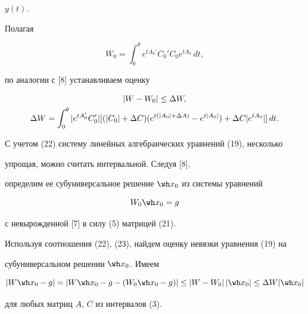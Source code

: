 $y(t)$.





Полагая


\begin{equation}


W_0 = \int_0^{\theta} e^{t A_0'} C_0' C_0 e^{ t A_0} \, d t,


\end{equation}


по аналогии с [8] устанавливаем оценку


\begin{gather}


|W-W_0| \le \Delta W, \notag \\


\Delta W = \int_{0}^{\theta}| e^{ t A_0' } C_0'|


[( |C_0|+\Delta C )(e^{ t ( |A_0|+\Delta A ) } -


e^{ t |A_0|})+\Delta C | e^{ t A_0 } |] \, dt.


\end{gather} 


С учетом (22) систему линейных алгебраических уравнений (19), несколько


упрощая, можно считать интервальной. Следуя [8],


определим ее субуниверсальное решение $\wh x_0$ из системы уравнений


\begin{equation}


W_0 \wh x_0 = g


\end{equation}


с невырожденной [7] в силу (5) матрицей (21).





Используя соотношения (22), (23), найдем оценку невязки уравнения (19) на


субуниверсальном решении $ \wh x_0$. Имеем


\begin{equation}


|W \wh x_0 - g| = | W \wh x_0 - g -( W_0 \wh x_0 - g)| \le


|W-W_0|\,|\wh x_0| \le \Delta W |\wh x_0|


\end{equation}%


для любых матриц $A$, $C$ из интервалов (3).





